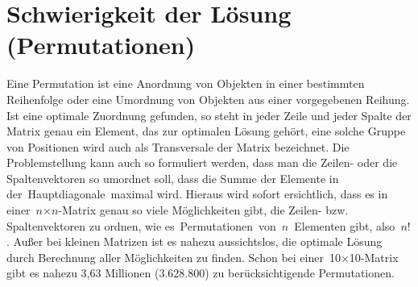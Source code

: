 %
%
%
\section{Schwierigkeit der Lösung (Permutationen)
\label{munkres:section:teil2}}

Eine Permutation ist eine Anordnung von Objekten in einer bestimmten Reihenfolge oder eine Umordnung von Objekten aus einer vorgegebenen Reihung. Ist eine optimale Zuordnung gefunden, so steht in jeder Zeile und jeder Spalte der Matrix genau ein Element, das zur optimalen Lösung gehört, eine solche Gruppe von Positionen wird auch als Transversale der Matrix bezeichnet. 
Die Problemstellung kann auch so formuliert werden, dass man die Zeilen- oder die Spaltenvektoren so umordnet soll, dass die Summe der Elemente in der Hauptdiagonale maximal wird. Hieraus wird sofort ersichtlich, dass es in einer $n$×$n$-Matrix genau so viele Möglichkeiten gibt, die Zeilen- bzw. Spaltenvektoren zu ordnen, wie es Permutationen von $n$ Elementen gibt, also $n!$. Außer bei kleinen Matrizen ist es nahezu aussichtslos, die optimale Lösung durch Berechnung aller Möglichkeiten zu finden. Schon bei einer 10×10-Matrix gibt es nahezu 3,63 Millionen (3.628.800) zu berücksichtigende Permutationen.

